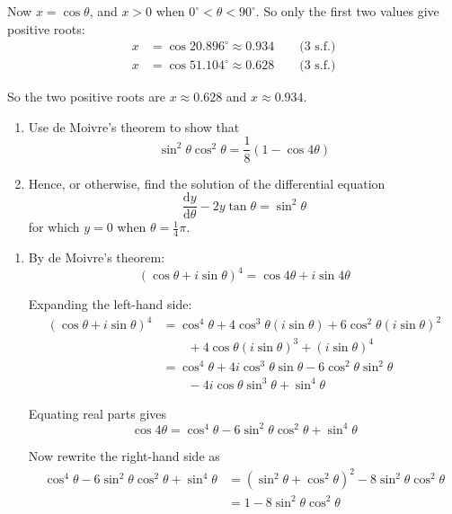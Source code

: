 \documentclass[leqno]{article}
\begin{document}
\begin{enumerate}[
  label=\textbf{\arabic*.},
  leftmargin=*,
  topsep=0pt,
  partopsep=0pt,
  parsep=0pt
]
\begin{djsSolution}
\begin{enumerate}[label=\textbf{(\alph*)}]
Now \(x=\cos\theta\), and \(x>0\) when \(0^\circ<\theta<90^\circ\). So only the first two values give positive roots:
\begin{align*}
x&=\cos20.896^\circ\approx 0.934\qquad\text{(3 s.f.)}\\
x&=\cos51.104^\circ\approx 0.628\qquad\text{(3 s.f.)}
\end{align*}

So the two positive roots are \(x\approx 0.628\) and \(x\approx 0.934\).
\end{enumerate}
\end{djsSolution}


\newpage

\questionitem

\begin{enumerate}[label=\textbf{(\alph*)}]
  \item Use de Moivre's theorem to show that
  \[
  \sin^2 \theta \cos^2 \theta = \frac{1}{8}(1-\cos 4\theta)
  \]
  \item Hence, or otherwise, find the solution of the differential equation
  \[
  \frac{\mathrm{d}y}{\mathrm{d}\theta} - 2y\tan \theta = \sin^2 \theta
  \]
  for which $y=0$ when $\theta=\frac{1}{4}\pi$.  \\
\end{enumerate}

\vspace*{10pt}

\begin{djsSolution}
\begin{enumerate}[label=\textbf{(\alph*)}]
  \item By de Moivre's theorem:
\[
(\cos\theta+i\sin\theta)^4=\cos4\theta+i\sin4\theta
\]

Expanding the left-hand side:
\begin{align*}
(\cos\theta+i\sin\theta)^4
&=\cos^4\theta+4\cos^3\theta(i\sin\theta)+6\cos^2\theta(i\sin\theta)^2 \\
&\qquad +4\cos\theta(i\sin\theta)^3+(i\sin\theta)^4 \\
&=\cos^4\theta+4i\cos^3\theta\sin\theta-6\cos^2\theta\sin^2\theta \\
&\qquad -4i\cos\theta\sin^3\theta+\sin^4\theta
\end{align*}

Equating real parts gives
\[
\cos4\theta=\cos^4\theta-6\sin^2\theta\cos^2\theta+\sin^4\theta
\]

Now rewrite the right-hand side as
\begin{align*}
\cos^4\theta-6\sin^2\theta\cos^2\theta+\sin^4\theta
&=(\sin^2\theta+\cos^2\theta)^2-8\sin^2\theta\cos^2\theta \\
&=1-8\sin^2\theta\cos^2\theta
\end{align*}


\end{enumerate}
\end{djsSolution}
\end{enumerate}
\end{document}
